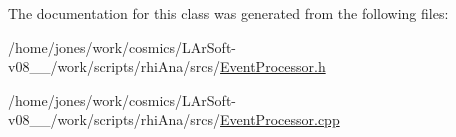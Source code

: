 The documentation for this class was generated from the following files\-:\begin{DoxyCompactItemize}
\item 
/home/jones/work/cosmics/\-L\-Ar\-Soft-\/v08\-\_\-\_/work/scripts/rhi\-Ana/srcs/\hyperlink{EventProcessor_8h}{Event\-Processor.\-h}\item 
/home/jones/work/cosmics/\-L\-Ar\-Soft-\/v08\-\_\-\_/work/scripts/rhi\-Ana/srcs/\hyperlink{EventProcessor_8cpp}{Event\-Processor.\-cpp}\end{DoxyCompactItemize}
